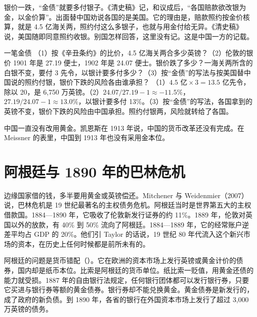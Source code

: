 银价一跌，“金债”就要多付银子。《清史稿》记，和议成后，“各国赔款欲改银为金，以金价算”\cite{qingshigao}。出面替中国劝说各国的是美国。它的理由是，赔款照约按金价核算，就是 4.5 亿海关两，照约付这么多银子，也就与用金付给无异\cite{qingshigao}。《清史稿》说，美国随即同意照约收银\cite{qingshigao}。别国怎样回答，这里没有记。这是中国一方的记载。

\begin{example}{一笔金债}\label{ex:periph-boxer}
（1）按《辛丑条约》的比价，4.5 亿海关两合多少英镑？（2）伦敦的银价 1901 年是 27.19 便士，1902 年是 24.07 便士。银价跌了多少？一海关两所含的白银不变，要付 3 先令，以银计要多付多少？（3）按“金债”的写法与按美国替中国说的照约付银，银价下跌的风险各由谁承担？
\solution （1）$4.5\text{ 亿}\times3=13.5$ 亿先令，除以 20，是 6,750 万英镑。（2）$24.07/27.19-1\approx-11.5\%$，$27.19/24.07-1\approx13.0\%$，以银计要多付 13\%。（3）按“金债”的写法，各国拿到的英镑不变，银价下跌的风险由中国承担。照约付银两，风险就转给了各国。
\end{example}

中国一直没有改用黄金。凯恩斯在 1913 年说，中国的货币改革还没有完成\cite{keynes1913}。在 Meissner 的表里，中国到 1913 年也没有采用金本位\cite{meissner2002}。

\section{阿根廷与 1890 年的巴林危机}\label{sec:periph-baring}

边缘国家借的钱，多半要用黄金或英镑偿还。Mitchener 与 Weidenmier（2007）说，巴林危机是 19 世纪最著名的主权债务危机\cite{mitchener2007}。阿根廷当时是世界第五大的主权借款国\cite{mitchener2007}。1884—1890 年，它吸收了伦敦新发行证券的约 11\%\cite{mitchener2007}。1889 年，伦敦对英国以外的放款，有 40\% 到 50\% 流向了阿根廷\cite{mitchener2007}。1884—1889 年，它的经常账户逆差平均占 GDP 的 20\%\cite{mitchener2007}。他们引 Taylor 的话说，19 世纪 80 年代流入这个新兴市场的资本，在历史上任何时候都是前所未有的\cite{mitchener2007}。

阿根廷的问题是货币错配（）。它在欧洲的资本市场上发行英镑或黄金计价的债券，国内却是纸币本位\cite{mitchener2007}。比索是阿根廷的货币单位。纸比索一贬值，用黄金还债的能力就受损\cite{mitchener2007}。1887 年的自由银行法规定，任何银行团体都可以发行银行券，只要它买进与银行券等额的黄金债券\cite{mitchener2007}。银行券却不能兑换黄金。黄金债券是新发行的，成了政府的新负债\cite{mitchener2007}。到 1890 年，各省的银行在外国资本市场上发行了超过 3,000 万英镑的债务\cite{mitchener2007}。

